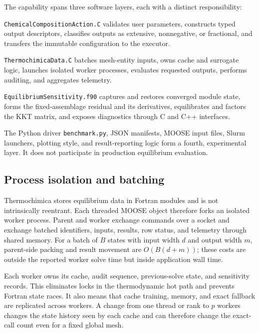 \documentclass[11pt]{article}
\newcommand{\code}[1]{\texttt{#1}}
\begin{document}
The capability spans three software layers, each with a distinct responsibility:
\begin{description}[style=nextline]
  \item[MOOSE action and configuration]
  \code{ChemicalCompositionAction.C} validates user parameters, constructs typed output
  descriptors, classifies outputs as extensive, nonnegative, or fractional, and transfers the
  immutable configuration to the executor.
  \item[MOOSE executor]
  \code{ThermochimicaData.C} batches mesh-entity inputs, owns cache and surrogate logic, launches
  isolated worker processes, evaluates requested outputs, performs auditing, and aggregates
  telemetry.
  \item[Thermochimica sensitivity API]
  \code{EquilibriumSensitivity.f90} captures and restores converged module state, forms the
  fixed-assemblage residual and its derivatives, equilibrates and factors the KKT matrix, and
  exposes diagnostics through C and C++ interfaces.
\end{description}
The Python driver \code{benchmark.py}, JSON manifests, MOOSE input files, Slurm launchers, plotting
style, and result-reporting logic form a fourth, experimental layer.  It does not participate in
production equilibrium evaluation.

\subsection{Process isolation and batching}

Thermochimica stores equilibrium data in Fortran modules and is not intrinsically reentrant.
Each threaded MOOSE object therefore forks an isolated worker process.  Parent and worker exchange
commands over a socket and exchange batched identifiers, inputs, results, row status, and
telemetry through shared memory.  For a batch of \(B\) states with input width \(d\) and output
width \(m\), parent-side packing and result movement are \(O(B(d+m))\); these costs are outside the
reported worker solve time but inside application wall time.

Each worker owns its cache, audit sequence, previous-solve state, and sensitivity records.  This
eliminates locks in the thermodynamic hot path and prevents Fortran state races.  It also means
that cache training, memory, and exact fallback are replicated across workers.  A change from one
thread or rank to \(p\) workers changes the state history seen by each cache and can therefore
change the exact-call count even for a fixed global mesh.
\end{document}
